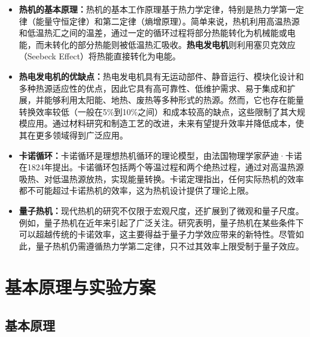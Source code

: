 \documentclass[dvipsnames, svgnames,a4paper,11pt]{article}
\begin{document}
        \begin{itemize}
            \item \textbf{热机的基本原理：}热机的基本工作原理基于热力学定律，特别是热力学第一定律（能量守恒定律）和第二定律（熵增原理）。简单来说，热机利用高温热源和低温热汇之间的温差，通过一定的循环过程将部分热能转化为机械能或电能，而未转化的部分热能则被低温热汇吸收。\textbf{热电发电机}则利用塞贝克效应（Seebeck Effect）将热能直接转化为电能。
            
            \item \textbf{热电发电机的优缺点：}热电发电机具有无运动部件、静音运行、模块化设计和多种热源适应性的优点，因此它具有高可靠性、低维护需求、易于集成和扩展，并能够利用太阳能、地热、废热等多种形式的热源。然而，它也存在能量转换效率较低（一般在5\%到10\%之间）和成本较高的缺点，这些限制了其大规模应用。通过材料研究和制造工艺的改进，未来有望提升效率并降低成本，使其在更多领域得到广泛应用。
            
            \item \textbf{卡诺循环：}卡诺循环是理想热机循环的理论模型，由法国物理学家萨迪·卡诺在1824年提出。卡诺循环包括两个等温过程和两个绝热过程，通过对高温热源吸热、对低温热源放热，实现能量转换。卡诺定理指出，任何实际热机的效率都不可能超过卡诺热机的效率，这为热机设计提供了理论上限。
            
            \item \textbf{量子热机：}现代热机的研究不仅限于宏观尺度，还扩展到了微观和量子尺度。例如，量子热机在近年来引起了广泛关注。研究表明，量子热机在某些条件下可以超越传统的卡诺效率，这主要得益于量子力学效应带来的新特性。尽管如此，量子热机仍需遵循热力学第二定律，只不过其效率上限受制于量子效应。


        \end{itemize}
















\section{基本原理与实验方案}
    
    
    \subsection{基本原理}
\end{document}
